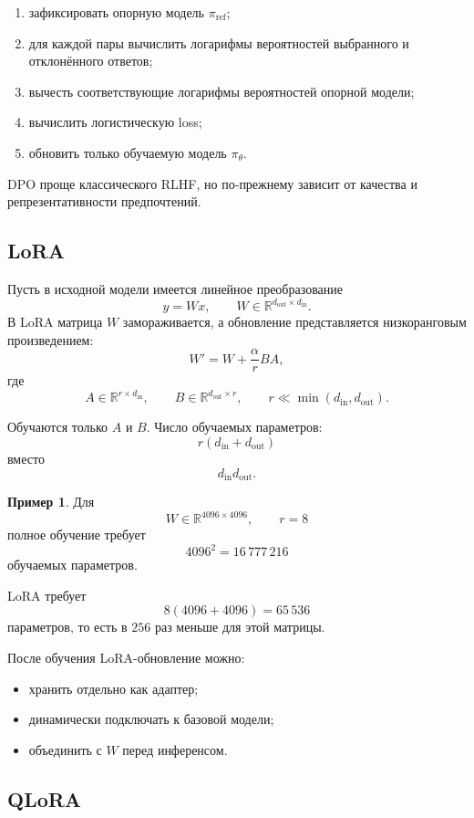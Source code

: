 \documentclass[12pt,a4paper]{article}
\newcommand{\R}{\mathbb{R}}
\newcommand{\1}{\mathbf{1}}
\theoremstyle{definition}
\newtheorem{example}[theorem]{Пример}
\theoremstyle{remark}
\begin{document}
\begin{enumerate}
    \item зафиксировать опорную модель $\pi_{\mathrm{ref}}$;
    \item для каждой пары вычислить логарифмы вероятностей выбранного и
    отклонённого ответов;
    \item вычесть соответствующие логарифмы вероятностей опорной модели;
    \item вычислить логистическую loss;
    \item обновить только обучаемую модель $\pi_\theta$.
\end{enumerate}

DPO проще классического RLHF, но по-прежнему зависит от качества и
репрезентативности предпочтений.

\subsection{LoRA}

Пусть в исходной модели имеется линейное преобразование
\[
y=Wx,
\qquad
W\in\R^{d_{\mathrm{out}}\times d_{\mathrm{in}}}.
\]
В LoRA матрица $W$ замораживается, а обновление представляется
низкоранговым произведением:
\[
W'=W+\frac{\alpha}{r}BA,
\]
где
\[
A\in\R^{r\times d_{\mathrm{in}}},
\qquad
B\in\R^{d_{\mathrm{out}}\times r},
\qquad
r\ll
\min(d_{\mathrm{in}},d_{\mathrm{out}}).
\]

Обучаются только $A$ и $B$. Число обучаемых параметров:
\[
r(d_{\mathrm{in}}+d_{\mathrm{out}})
\]
вместо
\[
d_{\mathrm{in}}d_{\mathrm{out}}.
\]

\begin{example}
Для
\[
W\in\R^{4096\times4096},
\qquad r=8
\]
полное обучение требует
\[
4096^2=16\,777\,216
\]
обучаемых параметров.

LoRA требует
\[
8(4096+4096)=65\,536
\]
параметров, то есть в $256$ раз меньше для этой матрицы.
\end{example}

После обучения LoRA-обновление можно:

\begin{itemize}
    \item хранить отдельно как адаптер;
    \item динамически подключать к базовой модели;
    \item объединить с $W$ перед инференсом.
\end{itemize}

\subsection{QLoRA}
\end{document}
